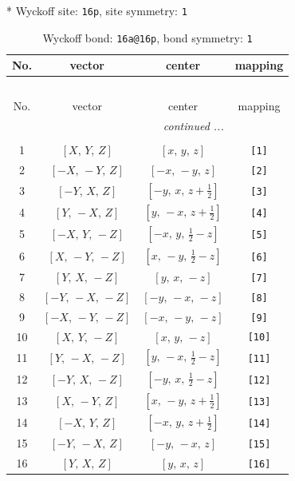\documentclass[fleqn,8pt]{jsarticle}
\begin{document}
* Wyckoff site: {\tt 16p}, site symmetry: {\tt 1}
\renewcommand{\arraystretch}{1.2}
\begin{longtable}{cccc}
\caption{Wyckoff bond: {\tt 16a@16p}, bond symmetry: {\tt 1}}
 \\
 \hline \hline
No. & vector & center & mapping \\ \hline \endfirsthead

\multicolumn{3}{l}{\tablename\ \thetable{}} \\
 \hline \hline
No. & vector & center & mapping \\ \hline \endhead

 \hline \hline
\multicolumn{3}{r}{\footnotesize\it continued ...} \\ \endfoot

 \hline \hline
\multicolumn{3}{r}{} \\ \endlastfoot

1 & $\left[ X,\, Y,\, Z \right]$ & $\left[ x,\, y,\, z \right]$ & {\tt [1]} \\ \hline
2 & $\left[ - X,\, - Y,\, Z \right]$ & $\left[ - x,\, - y,\, z \right]$ & {\tt [2]} \\ \hline
3 & $\left[ - Y,\, X,\, Z \right]$ & $\left[ - y,\, x,\, z + \frac{1}{2} \right]$ & {\tt [3]} \\ \hline
4 & $\left[ Y,\, - X,\, Z \right]$ & $\left[ y,\, - x,\, z + \frac{1}{2} \right]$ & {\tt [4]} \\ \hline
5 & $\left[ - X,\, Y,\, - Z \right]$ & $\left[ - x,\, y,\, \frac{1}{2} - z \right]$ & {\tt [5]} \\ \hline
6 & $\left[ X,\, - Y,\, - Z \right]$ & $\left[ x,\, - y,\, \frac{1}{2} - z \right]$ & {\tt [6]} \\ \hline
7 & $\left[ Y,\, X,\, - Z \right]$ & $\left[ y,\, x,\, - z \right]$ & {\tt [7]} \\ \hline
8 & $\left[ - Y,\, - X,\, - Z \right]$ & $\left[ - y,\, - x,\, - z \right]$ & {\tt [8]} \\ \hline
9 & $\left[ - X,\, - Y,\, - Z \right]$ & $\left[ - x,\, - y,\, - z \right]$ & {\tt [9]} \\ \hline
10 & $\left[ X,\, Y,\, - Z \right]$ & $\left[ x,\, y,\, - z \right]$ & {\tt [10]} \\ \hline
11 & $\left[ Y,\, - X,\, - Z \right]$ & $\left[ y,\, - x,\, \frac{1}{2} - z \right]$ & {\tt [11]} \\ \hline
12 & $\left[ - Y,\, X,\, - Z \right]$ & $\left[ - y,\, x,\, \frac{1}{2} - z \right]$ & {\tt [12]} \\ \hline
13 & $\left[ X,\, - Y,\, Z \right]$ & $\left[ x,\, - y,\, z + \frac{1}{2} \right]$ & {\tt [13]} \\ \hline
14 & $\left[ - X,\, Y,\, Z \right]$ & $\left[ - x,\, y,\, z + \frac{1}{2} \right]$ & {\tt [14]} \\ \hline
15 & $\left[ - Y,\, - X,\, Z \right]$ & $\left[ - y,\, - x,\, z \right]$ & {\tt [15]} \\ \hline
16 & $\left[ Y,\, X,\, Z \right]$ & $\left[ y,\, x,\, z \right]$ & {\tt [16]} \\
\end{longtable}
\end{document}
